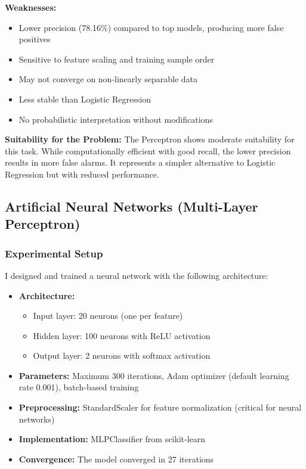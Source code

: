 \documentclass[sigconf]{acmart}
\begin{document}
\textbf{Weaknesses:}
\begin{itemize}
    \item Lower precision (78.16\%) compared to top models, producing more false positives
    \item Sensitive to feature scaling and training sample order
    \item May not converge on non-linearly separable data
    \item Less stable than Logistic Regression
    \item No probabilistic interpretation without modifications
\end{itemize}

\textbf{Suitability for the Problem:} The Perceptron shows moderate suitability for this task. While computationally efficient with good recall, the lower precision results in more false alarms. It represents a simpler alternative to Logistic Regression but with reduced performance.

\subsection{Artificial Neural Networks (Multi-Layer Perceptron)}

\subsubsection{Experimental Setup}
I designed and trained a neural network with the following architecture:
\begin{itemize}
    \item \textbf{Architecture:} 
    \begin{itemize}
        \item Input layer: 20 neurons (one per feature)
        \item Hidden layer: 100 neurons with ReLU activation
        \item Output layer: 2 neurons with softmax activation
    \end{itemize}
    \item \textbf{Parameters:} Maximum 300 iterations, Adam optimizer (default learning rate 0.001), batch-based training
    \item \textbf{Preprocessing:} StandardScaler for feature normalization (critical for neural networks)
    \item \textbf{Implementation:} MLPClassifier from scikit-learn
    \item \textbf{Convergence:} The model converged in 27 iterations
\end{itemize}
\end{document}
